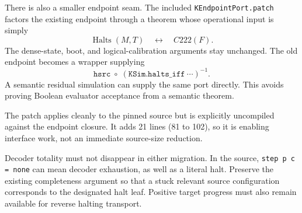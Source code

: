 There is also a smaller endpoint seam. The included \texttt{KEndpointPort.patch} factors the existing endpoint through a theorem whose operational input is simply
\[
 \operatorname{Halts}(M,T)
 \quad\longleftrightarrow\quad C222(F).
\]
The dense-state, boot, and logical-calibration arguments stay unchanged. The old endpoint becomes a wrapper supplying
\[
  \texttt{hsrc}\;\circ\;
  (\texttt{KSim.halts\_iff}\ \cdots)^{-1}.
\]
A semantic residual simulation can supply the same port directly. This avoids proving Boolean evaluator acceptance from a semantic theorem.

The patch applies cleanly to the pinned source but is explicitly uncompiled against the endpoint closure. It adds 21 lines (81 to 102), so it is enabling interface work, not an immediate source-size reduction.

Decoder totality must not disappear in either migration. In the source, \texttt{step p c = none} can mean decoder exhaustion, as well as a literal halt. Preserve the existing completeness argument so that a stuck relevant source configuration corresponds to the designated halt leaf. Positive target progress must also remain available for reverse halting transport.
